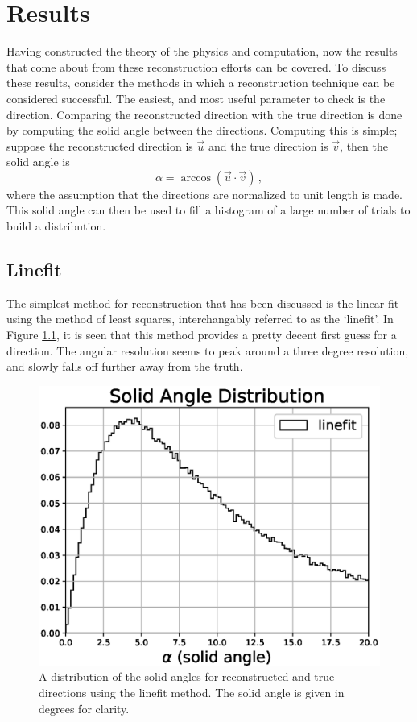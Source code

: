 \chapter{Results}\label{ch:results}

Having constructed the theory of the physics and computation, now the results that come about from these reconstruction efforts can be covered. To discuss these results, consider the methods in which a reconstruction technique can be considered successful. The easiest, and most useful parameter to check is the direction. Comparing the reconstructed direction with the true direction is done by computing the solid angle between the directions. Computing this is simple; suppose the reconstructed direction is $\vec{u}$ and the true direction is $\vec{v}$, then the solid angle is
\begin{equation}
  \alpha = \arccos(\vec{u}\cdot\vec{v})\, ,
\end{equation}
where the assumption that the directions are normalized to unit length is made. This solid angle can then be used to fill a histogram of a large number of trials to build a distribution. 

\section{Linefit}

The simplest method for reconstruction that has been discussed is the linear fit using the method of least squares, interchangably referred to as the `linefit'. In Figure \ref{fig:alpha_linefit}, it is seen that this method provides a pretty decent first guess for a direction. The angular resolution seems to peak around a three degree resolution, and slowly falls off further away from the truth. 

\begin{figure}[H]
  \centering
  \includegraphics[width=12cm]{./Figures/reco_plots/alpha_dist_linefit_norm.eps}
  \caption{A distribution of the solid angles for reconstructed and true directions using the linefit method. The solid angle is given in degrees for clarity.}
  \label{fig:alpha_linefit}
\end{figure}

